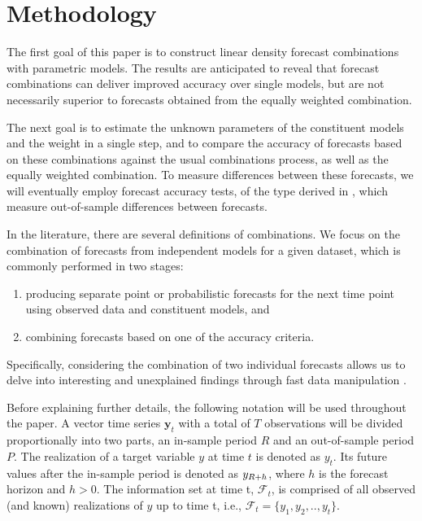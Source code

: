 \documentclass{monashthesis}
\begin{document}
\hypertarget{method}{%
\chapter{Methodology}\label{method}}

The first goal of this paper is to construct linear density forecast combinations with parametric models. The results are anticipated to reveal that forecast combinations can deliver improved accuracy over single models, but are not necessarily superior to forecasts obtained from the equally weighted combination.

The next goal is to estimate the unknown parameters of the constituent models and the weight in a single step, and to compare the accuracy of forecasts based on these combinations against the usual combinations process, as well as the equally weighted combination. To measure differences between these forecasts, we will eventually employ forecast accuracy tests, of the type derived in \textcite{W96}, which measure out-of-sample differences between forecasts.

In the literature, there are several definitions of combinations. We focus on the combination of forecasts from independent models for a given dataset, which is commonly performed in two stages:

\begin{enumerate}
\def\labelenumi{\arabic{enumi}.}
\item
  producing separate point or probabilistic forecasts for the next time point using observed data and constituent models, and
\item
  combining forecasts based on one of the accuracy criteria.
\end{enumerate}

Specifically, considering the combination of two individual forecasts allows us to delve into interesting and unexplained findings through fast data manipulation \autocite{BS16}.

Before explaining further details, the following notation will be used throughout the paper. A vector time series \(\textbf{y}_t\) with a total of \(T\) observations will be divided proportionally into two parts, an in-sample period \(R\) and an out-of-sample period \(P\). The realization of a target variable \(y\) at time \(t\) is denoted as \(y_{t}\). Its future values after the in-sample period is denoted as \(y_{\small{R+h}}\), where \(h\) is the forecast horizon and \(h>0\). The information set at time t, \(\mathcal{F}_t\), is comprised of all observed (and known) realizations of \(y\) up to time t, i.e., \(\mathcal{F}_t = \{y_1, y_2, .., y_t\}\).
\end{document}
